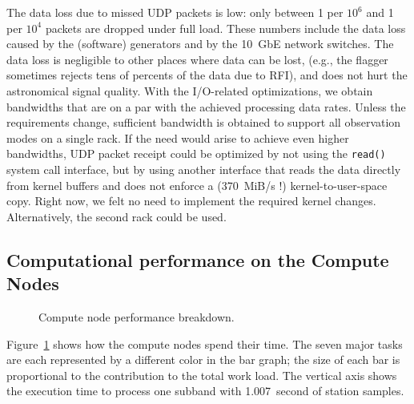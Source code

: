 \documentclass{sig-alternate}
\begin{document}
The data loss due to missed UDP packets is low: only between 1 per $10^6$ and
1 per $10^4$ packets are dropped under full load.
These numbers include the data loss caused by the (software) generators and by
the 10~GbE network switches.
The data loss is negligible to other places where data can be lost,
(e.g., the flagger sometimes rejects tens of percents of the data due to RFI),
and does not hurt the astronomical signal quality.
With the I/O-related optimizations, we obtain bandwidths that are on a par
with the achieved processing data rates.
Unless the requirements change, sufficient bandwidth is obtained to support
all observation modes on a single rack.
If the need would arise to achieve even higher bandwidths, UDP packet receipt
could be optimized by not using the \texttt{read()} system call interface,
but by using another interface that reads the data directly from kernel buffers
and does not enforce a (370~MiB/s !) kernel-to-user-space copy.
Right now, we felt no need to implement the required kernel changes.
Alternatively, the second rack could be used.


\subsection{Computational performance on the Compute Nodes}

\begin{figure}[ht]
\hfill
\caption{Compute node performance breakdown.}
\label{fig:cn-performance}
\end{figure}

Figure~\ref{fig:cn-performance} shows how the compute nodes spend their time.
The seven major tasks are each represented by a different color in the bar
graph; the size of each bar is proportional to the contribution to the total
work load.
The vertical axis shows the execution time to process one subband with
1.007~second of station samples.
\end{document}

